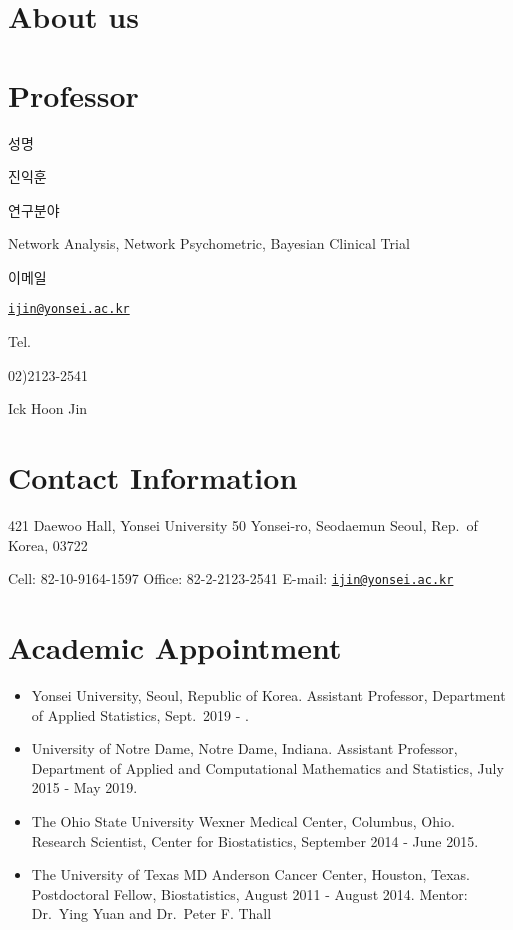\documentclass[
]{book}
\author{}
\date{\vspace{-2.5em}}
\begin{document}
{
\setcounter{tocdepth}{1}
\tableofcontents
}
\hypertarget{about-us}{%
\chapter*{About us}\label{about-us}}

\hypertarget{professor}{%
\chapter*{Professor}\label{professor}}

성명

진익훈

연구분야

Network Analysis, Network Psychometric, Bayesian Clinical Trial

이메일

\href{mailto:ijin@yonsei.ac.kr}{\nolinkurl{ijin@yonsei.ac.kr}}

Tel.

02)2123-2541

Ick Hoon Jin

\hypertarget{contact-information}{%
\chapter*{Contact Information}\label{contact-information}}

421 Daewoo Hall, Yonsei University
50 Yonsei-ro, Seodaemun
Seoul, Rep.~of Korea, 03722

Cell: 82-10-9164-1597
Office: 82-2-2123-2541
E-mail: \href{mailto:ijin@yonsei.ac.kr}{\nolinkurl{ijin@yonsei.ac.kr}}

\hypertarget{academic-appointment}{%
\chapter*{Academic Appointment}\label{academic-appointment}}

\begin{itemize}
\item
  Yonsei University, Seoul, Republic of Korea.
  Assistant Professor, Department of Applied Statistics, Sept.~2019 - .
\item
  University of Notre Dame, Notre Dame, Indiana.
  Assistant Professor, Department of Applied and Computational Mathematics and Statistics, July 2015 - May 2019.
\item
  The Ohio State University Wexner Medical Center, Columbus, Ohio.
  Research Scientist, Center for Biostatistics, September 2014 - June 2015.
\item
  The University of Texas MD Anderson Cancer Center, Houston, Texas.
  Postdoctoral Fellow, Biostatistics, August 2011 - August 2014.
  Mentor: Dr.~Ying Yuan and Dr.~Peter F. Thall
\end{itemize}
\end{document}
